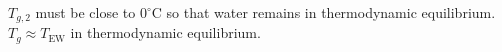 \( T_{g,2} \) must be close to \( 0^\circ \text{C} \) so that water remains in thermodynamic equilibrium.  
\( T_g \approx T_{\text{EW}} \) in thermodynamic equilibrium.